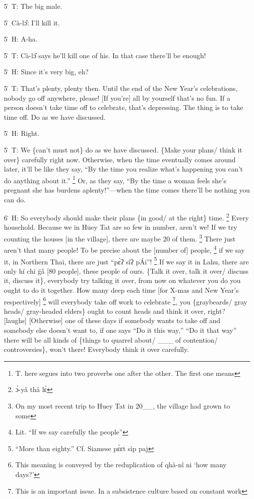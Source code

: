 5\. T: The big male.

5\. Cà-lɔ̂: I'll kill it.

5\. H: A-ha.

5\. T: Cà-lɔ̂ says he'll kill one of his.  In that case there'll be enough!

5\. H: Since it's very big, eh?

5\. T: That's plenty, plenty then.  Until the end of the New Year's celebrations,
nobody go off anywhere, please!  [If you're] all by yourself that's no fun.  If
a person doesn't take time off to celebrate, that's depressing.  The thing is to
take time off.  Do as we have discussed.

5\. H: Right.

5\. T: We \{can't must not\} do as we have discussed.  \{Make your plans/ think
it over\} carefully right now.  Otherwise, when the time eventually comes around
later, it'll be like they say, ``By the time you realize what's happening you can't
do anything about it.'' \footnote{T. here segues into two proverbs one after the other.  The first one means} Or, as they say, ``By the time a woman feels she's
pregnant she has burdens aplenty!''---when the time comes there'll be nothing you
can do.

6\. H: So everybody should make their plans \{in good/ at the right\} time. \footnote{ɔ̀-yâ thâ lɛ̀}
Every household.  Because we in Huey Tat are so few in number, aren't we!  If
we try counting the houses [in the village], there are maybe 20 of them. \footnote{On my most recent trip to Huey Tat in 20\_\_, the village had grown to some} There
just aren't that many people!  To be precise about the [number of] people, \footnote{Lit. ``If we say carefully the people''}
if we say it, in Northern Thai, there are just ``pɛ̀ʔ sîʔ pÁi''! \footnote{``More than eighty.'' Cf. Siamese pɛ̀ɛt sìp paj} If
we say it in Lahu, there are only hí chi g̈â [80 people], these people of ours.
\{Talk it over, talk it over/ discuss it, discuss it\}, everybody try talking
it over, from now on whatever you do you ought to do it together.  How many deep
each time [for X-mas and New Year's respectively] \footnote{This meaning is conveyed by the reduplication of qhà-nî ni `how many days?'} will everybody take off
work to celebrate \footnote{This is an important issue.  In a subsistence culture based on constant work}, you \{graybeards/ gray heads/ gray-headed elders\} ought
to count heads and think it over, right? [laughs] [Otherwise] one of these days
if somebody wants to take off and somebody else doesn't want to, if one says ``Do
it this way,'' ``Do it that way'' there will be all kinds of \{things to quarrel
about/ \_\_\_ of contention/ controversies\}, won't there!  Everybody think it
over carefully.

